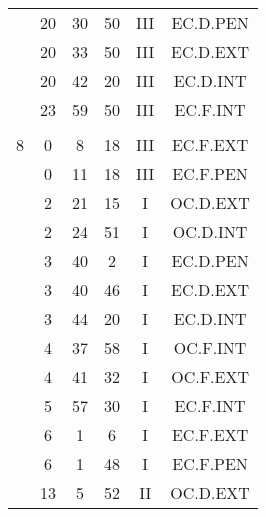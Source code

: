 \documentclass[12pt, a4paper]{article}
\begin{document}
\begin{multicols}{3}
{\begin{tabular}{c c c c c c}
	 	 	 	 & 20 & 30 & 50 & III & EC.D.PEN\\%
	 	 	 	 & 20 & 33 & 50 & III & EC.D.EXT\\%
	 	 	 	 & 20 & 42 & 20 & III & EC.D.INT\\%
	 	 	 	 & 23 & 59 & 50 & III & EC.F.INT\\%
	 	 	 	 & & & & & \\%
	 	 	 	8 & 0 & 8 & 18 & III & EC.F.EXT\\%
	 	 	 	 & 0 & 11 & 18 & III & EC.F.PEN\\%
	 	 	 	 & 2 & 21 & 15 & I & OC.D.EXT\\%
	 	 	 	 & 2 & 24 & 51 & I & OC.D.INT\\%
	 	 	 	 & 3 & 40 & 2 & I & EC.D.PEN\\%
	 	 	 	 & 3 & 40 & 46 & I & EC.D.EXT\\%
	 	 	 	 & 3 & 44 & 20 & I & EC.D.INT\\%
	 	 	 	 & 4 & 37 & 58 & I & OC.F.INT\\%
	 	 	 	 & 4 & 41 & 32 & I & OC.F.EXT\\%
	 	 	 	 & 5 & 57 & 30 & I & EC.F.INT\\%
	 	 	 	 & 6 & 1 & 6 & I & EC.F.EXT\\%
	 	 	 	 & 6 & 1 & 48 & I & EC.F.PEN\\%
	 	 	 	 & 13 & 5 & 52 & II & OC.D.EXT\\%
	 	 \end{tabular}
 	}
\end{multicols}
\end{document}
